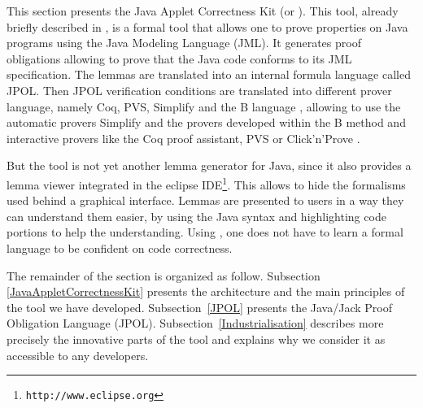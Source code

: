   This section presents the Java Applet Correctness Kit
 (or \JACK).  This tool, already briefly described in
 \cite{BR-gdc2002,BRL-JACK}, is a formal tool that allows one to prove properties on
 Java programs using the Java Modeling Language \cite{Leavens-Baker-Ruby03} (JML).
 It generates proof obligations
 allowing to prove that the Java code conforms to its JML
 specification.  The lemmas are translated into an internal formula language called JPOL. Then JPOL verification conditions are translated into different prover language, namely Coq, PVS, Simplify and the B language \cite{bbook},
 allowing to use the automatic provers Simplify and the provers developed within the B method and interactive provers like the Coq proof assistant, PVS or Click'n'Prove .

 But the tool is not yet another lemma generator for Java, since it also provides a lemma
 viewer integrated in the eclipse
 IDE\footnote{\texttt{http://www.eclipse.org}}.  This allows to
 hide the formalisms used behind a graphical interface.  Lemmas are
 presented to users in a way they can understand them easier, by using the Java syntax and highlighting code portions to help
 the understanding. Using \JACK, one does not have to learn a formal language to be confident on
code correctness.

 The remainder of the section is organized as follow.  Subsection \ref{JavaAppletCorrectnessKit} presents the
 architecture and the main principles of the tool we have
 developed.
Subsection~\ref{JPOL} presents the Java/Jack Proof Obligation Language (JPOL).
Subsection~\ref{Industrialisation} describes more precisely
 the innovative parts of the tool and explains why we consider it as
 accessible to any developers.
